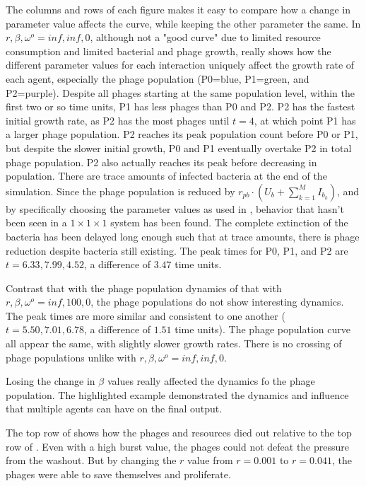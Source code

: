 The columns and rows of each figure makes it easy to compare how a change in parameter value affects the curve, while keeping the other parameter the same. 
In $r, \beta, \omega^o=inf, inf, 0$, although not a "good curve" due to limited resource consumption and limited bacterial and phage growth, really shows how the different parameter values for each interaction uniquely affect the growth rate of each agent, especially the phage population (P0=blue, P1=green, and P2=purple). 
Despite all phages starting at the same population level, within the first two or so time units, P1 has less phages than P0 and P2. 
P2 has the fastest initial growth rate, as P2 has the most phages until $t=4$, at which point P1 has a larger phage population. 
P2 reaches its peak population count before P0 or P1, but despite the slower initial growth, P0 and P1 eventually overtake P2 in total phage population. 
P2 also actually reaches its peak before decreasing in population. 
There are trace amounts of infected bacteria at the end of the simulation. 
Since the phage population is reduced by $r_{pb}\cdot(U_b + \sum_{k=1}^M I_{b_k})$, and by specifically choosing the parameter values as used in , behavior that hasn't been seen in a $1\times 1\times 1$ system has been found. 
The complete extinction of the bacteria has been delayed long enough such that at trace amounts, there is phage reduction despite bacteria still existing. 
The peak times for P0, P1, and P2 are $t=6.33, 7.99, 4.52$, a difference of $3.47$ time units. 

Contrast that with the phage population dynamics of that with $r, \beta, \omega^o = inf, 100, 0$, the phage populations do not show interesting dynamics. 
The peak times are more similar and consistent to one another ($t=5.50, 7.01, 6.78$, a difference of $1.51$ time units). 
The phage population curve all appear the same, with slightly slower growth rates. 
There is no crossing of phage populations unlike with $r, \beta, \omega^o=inf, inf, 0$. 

Losing the change in $\beta$ values really affected the dynamics fo the phage population. 
The highlighted example demonstrated the dynamics and influence that multiple agents can have on the final output. 

The top row of  shows how the phages and resources died out relative to the top row of . 
Even with a high burst value, the phages could not defeat the pressure from the washout. 
But by changing the $r$ value from $r=0.001$ to $r=0.041$, the phages were able to save themselves and proliferate. 

